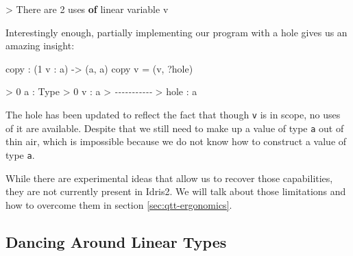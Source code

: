 \documentclass[
]{article}
\newenvironment{Shaded}{}{}
\newcommand{\CommentTok}[1]{\textcolor[rgb]{0.38,0.63,0.69}{\textit{#1}}}
\newcommand{\DataTypeTok}[1]{\textcolor[rgb]{0.56,0.13,0.00}{#1}}
\newcommand{\DecValTok}[1]{\textcolor[rgb]{0.25,0.63,0.44}{#1}}
\newcommand{\KeywordTok}[1]{\textcolor[rgb]{0.00,0.44,0.13}{\textbf{#1}}}
\newcommand{\NormalTok}[1]{#1}
\newcommand{\OperatorTok}[1]{\textcolor[rgb]{0.40,0.40,0.40}{#1}}
\newcommand{\OtherTok}[1]{\textcolor[rgb]{0.00,0.44,0.13}{#1}}
\begin{document}
\begin{Shaded}
\begin{Highlighting}[]
\OperatorTok{\textgreater{}} \DataTypeTok{There}\NormalTok{ are }\DecValTok{2}\NormalTok{ uses }\KeywordTok{of}\NormalTok{ linear variable v}
\end{Highlighting}
\end{Shaded}

Interestingly enough, partially implementing our program with a hole
gives us an amazing insight:

\begin{Shaded}
\begin{Highlighting}[]
\NormalTok{copy }\OperatorTok{:}\NormalTok{ (}\DecValTok{1}\NormalTok{ v }\OperatorTok{:}\NormalTok{ a) }\OtherTok{{-}\textgreater{}}\NormalTok{ (a, a)}
\NormalTok{copy v }\OtherTok{=}\NormalTok{ (v, }\OperatorTok{?}\NormalTok{hole)}
\end{Highlighting}
\end{Shaded}

\begin{Shaded}
\begin{Highlighting}[]
\OperatorTok{\textgreater{}} \DecValTok{0}\NormalTok{ a }\OperatorTok{:} \DataTypeTok{Type}
\OperatorTok{\textgreater{}} \DecValTok{0}\NormalTok{ v }\OperatorTok{:}\NormalTok{ a}
\OperatorTok{\textgreater{}} \CommentTok{{-}{-}{-}{-}{-}{-}{-}{-}{-}{-}{-}}
\OperatorTok{\textgreater{}}\NormalTok{ hole }\OperatorTok{:}\NormalTok{ a}
\end{Highlighting}
\end{Shaded}

The hole has been updated to reflect the fact that though \texttt{v} is
in scope, no uses of it are available. Despite that we still need to
make up a value of type \texttt{a} out of thin air, which is impossible
because we do not know how to construct a value of type \texttt{a}.

While there are experimental ideas that allow us to recover those
capabilities, they are not currently present in Idris2. We will talk
about those limitations and how to overcome them in section
\ref{sec:qtt-ergonomics}.

\hypertarget{dancing-around-linear-types}{%
\subsection{Dancing Around Linear
Types}\label{dancing-around-linear-types}}

\label{subsec:dancing-around}
\end{document}
